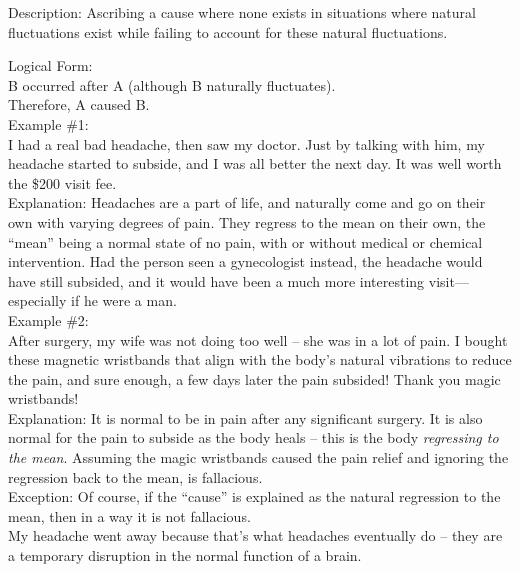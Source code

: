 \documentclass[a4paper,12pt,single,pdftex]{scrartcl}
\begin{document}
  
    Description: Ascribing a cause where none exists in situations where natural fluctuations exist while failing to account for these natural fluctuations.

    
      Logical Form:
    \\

    
      B occurred after A (although B naturally fluctuates).
    \\

    
      Therefore, A caused B.
    \\

    
      Example \#1:
    \\

    
      I had a real bad headache, then saw my doctor.  Just by talking with him, my headache started to subside, and I was all better the next day.  It was well worth the \$200 visit fee.
    \\

    
      Explanation: Headaches are a part of life, and naturally come and go on their own with varying degrees of pain. They regress to the mean on their own, the “mean” being a normal state of no pain, with or without medical or chemical intervention. Had the person seen a gynecologist instead, the headache would have still subsided, and it would have been a much more interesting visit—especially if he were a man.
    \\

    
      Example \#2:
    \\

    
      After surgery, my wife was not doing too well -- she was in a lot of pain.  I bought these magnetic wristbands that align with the body's natural vibrations to reduce the pain, and sure enough, a few days later the pain subsided!  Thank you magic wristbands!
    \\

    
      Explanation: It is normal to be in pain after any significant surgery.  It is also normal for the pain to subside as the body heals -- this is the body {\it regressing to the mean}.  Assuming the magic wristbands caused the pain relief and ignoring the regression back to the mean, is fallacious.
    \\

    
      Exception: Of course, if the “cause” is explained as the natural regression to the mean, then in a way it is not fallacious.
    \\

    
      My headache went away because that’s what headaches eventually do -- they are a temporary disruption in the normal function of a brain.
    \\
\end{document}
